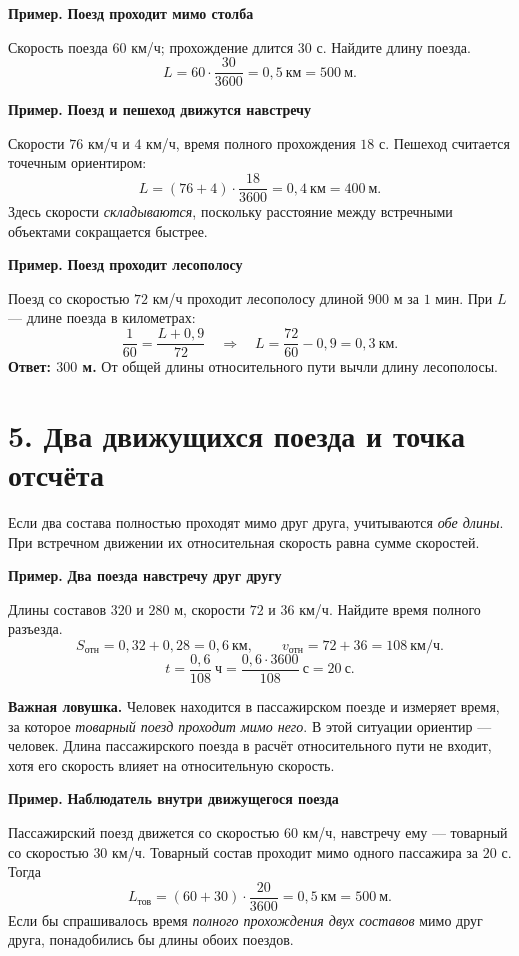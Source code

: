 \documentclass[a4paper,12pt]{article}
\newcommand{\key}[1]{\textcolor{darkaccent}{\textbf{#1}}}
\newcommand{\ans}[1]{\textcolor{darkaccent}{\textbf{#1}}}
\newcommand{\ex}[1]{\par\smallskip\noindent\key{Пример.} \textbf{#1}\par\smallskip}
\begin{document}
\ex{Поезд проходит мимо столба}
Скорость поезда $60$ км/ч; прохождение длится $30$ с. Найдите длину поезда.
\[
L=60\cdot\frac{30}{3600}=0{,}5\ \text{км}=\boxed{500\ \text{м}}.
\]

\ex{Поезд и пешеход движутся навстречу}
Скорости $76$ км/ч и $4$ км/ч, время полного прохождения $18$ с. Пешеход считается точечным ориентиром:
\[
L=(76+4)\cdot\frac{18}{3600}=0{,}4\ \text{км}=\boxed{400\ \text{м}}.
\]
Здесь скорости \emph{складываются}, поскольку расстояние между встречными объектами сокращается быстрее.

\ex{Поезд проходит лесополосу}
Поезд со скоростью $72$ км/ч проходит лесополосу длиной $900$ м за $1$ мин. При $L$ --- длине поезда в километрах:
\[
\frac1{60}=\frac{L+0{,}9}{72}
\quad\Longrightarrow\quad
L=\frac{72}{60}-0{,}9=0{,}3\ \text{км}.
\]
\ans{Ответ: $300$ м.} От общей длины относительного пути вычли длину лесополосы.

\clearpage
\section*{5. Два движущихся поезда и точка отсчёта}
Если два состава полностью проходят мимо друг друга, учитываются \emph{обе длины}. При встречном движении их относительная скорость равна сумме скоростей.

\ex{Два поезда навстречу друг другу}
Длины составов $320$ и $280$ м, скорости $72$ и $36$ км/ч. Найдите время полного разъезда.
\[
S_{\text{отн}}=0{,}32+0{,}28=0{,}6\ \text{км},\qquad
v_{\text{отн}}=72+36=108\ \text{км/ч}.
\]
\[
t=\frac{0{,}6}{108}\ \text{ч}=\frac{0{,}6\cdot3600}{108}\ \text{с}
=\boxed{20\ \text{с}}.
\]

\key{Важная ловушка.} Человек находится в пассажирском поезде и измеряет время, за которое \emph{товарный поезд проходит мимо него}. В этой ситуации ориентир --- человек. Длина пассажирского поезда в расчёт относительного пути не входит, хотя его скорость влияет на относительную скорость.

\ex{Наблюдатель внутри движущегося поезда}
Пассажирский поезд движется со скоростью $60$ км/ч, навстречу ему --- товарный со скоростью $30$ км/ч. Товарный состав проходит мимо одного пассажира за $20$ с. Тогда
\[
L_{\text{тов}}=(60+30)\cdot\frac{20}{3600}
=0{,}5\ \text{км}=\boxed{500\ \text{м}}.
\]
Если бы спрашивалось время \emph{полного прохождения двух составов} мимо друг друга, понадобились бы длины обоих поездов.
\end{document}
